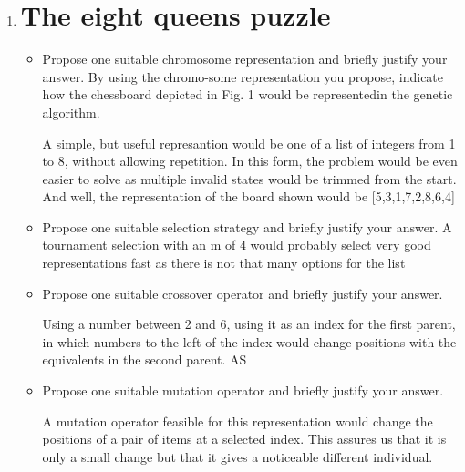 \documentclass{article}
\begin{document}
\begin{enumerate}
    \item \section*{The eight queens puzzle}
    \begin{itemize}
        \item Propose one suitable chromosome representation and briefly justify your answer.  By using the chromo-some representation you propose, indicate how the chessboard depicted in Fig. 1 would be representedin the genetic algorithm.

        A simple, but useful represantion would be one of a list of integers from 1 to 8, without allowing repetition. In this form, the problem would be even easier to solve as multiple invalid states would be trimmed from the start. And well, the representation of the board shown would be [5,3,1,7,2,8,6,4]

        \item Propose one suitable selection strategy and briefly justify your answer.
        A tournament selection with an m of 4 would probably select very good representations fast as there is not that many options for the list

        \item Propose one suitable crossover operator and briefly justify your answer.

        Using a number between 2 and 6, using it as an index for the first parent, in which numbers to the left of the index would change positions with the equivalents in the second parent. AS

        \item Propose one suitable mutation operator and briefly justify your answer.

        A mutation operator feasible for this representation would change the positions of a pair of items at a selected index. This assures us that it is only a small change but that it gives a noticeable different individual.



\end{itemize}
\end{enumerate}
\end{document}
